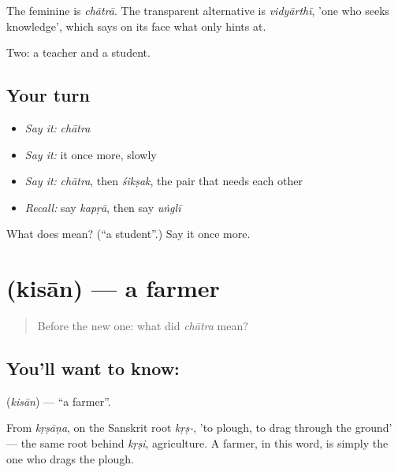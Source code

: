 The feminine is \emph{chātrā}. The transparent alternative is \emph{vidyārthī}, 'one who seeks knowledge', which says on its face what  only hints at.

\begin{grammarlens}[title={What you've built}]
Two: a teacher and a student.
\end{grammarlens}

\subsection*{Your turn}
\begin{itemize}
\raggedright
  \item \emph{Say it:} \emph{chātra}
  \item \emph{Say it:} it once more, slowly
  \item \emph{Say it:} \emph{chātra}, then \emph{śikṣak}, the pair that needs each other
  \item \emph{Recall:} say \emph{kapṛā}, then say \emph{uṅglī}
\end{itemize}

\begin{tcolorbox}[breakable,colback=teal!4,colframe=teal!35!black,title={Before you move on}]
What does  mean? (\textquotedblleft{}a student\textquotedblright{}.) Say it once more.
\end{tcolorbox}
\section[\texorpdfstring{\hi{किसान} (kisān)}{किसान (kisān)}]{ (kisān) — a farmer}

\label{lesson:HI-C47-farmer}



\begin{quote}
Before the new one: what did \emph{chātra} mean?
\end{quote}

\subsection*{You'll want to know: }
\textbf{} (\emph{kisān}) — \textquotedblleft{}a farmer\textquotedblright{}.

From \emph{kṛṣāṇa}, on the Sanskrit root \emph{kṛṣ-}, 'to plough, to drag through the ground' — the same root behind \emph{kṛṣi}, agriculture. A farmer, in this word, is simply the one who drags the plough.

